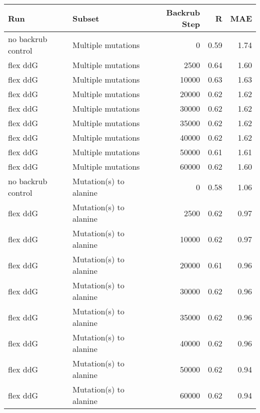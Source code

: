 \begin{table}
\begin{tabular}{llrrr}
\toprule
                Run &                               Subset &  Backrub Step &    R &  MAE \\
\midrule
 no backrub control &                   Multiple mutations &             0 & 0.59 & 1.74 \\
           flex ddG &                   Multiple mutations &          2500 & 0.64 & 1.60 \\
           flex ddG &                   Multiple mutations &         10000 & 0.63 & 1.63 \\
           flex ddG &                   Multiple mutations &         20000 & 0.62 & 1.62 \\
           flex ddG &                   Multiple mutations &         30000 & 0.62 & 1.62 \\
           flex ddG &                   Multiple mutations &         35000 & 0.62 & 1.62 \\
           flex ddG &                   Multiple mutations &         40000 & 0.62 & 1.62 \\
           flex ddG &                   Multiple mutations &         50000 & 0.61 & 1.61 \\
           flex ddG &                   Multiple mutations &         60000 & 0.62 & 1.60 \\
 no backrub control &               Mutation(s) to alanine &             0 & 0.58 & 1.06 \\
           flex ddG &               Mutation(s) to alanine &          2500 & 0.62 & 0.97 \\
           flex ddG &               Mutation(s) to alanine &         10000 & 0.62 & 0.97 \\
           flex ddG &               Mutation(s) to alanine &         20000 & 0.61 & 0.96 \\
           flex ddG &               Mutation(s) to alanine &         30000 & 0.62 & 0.96 \\
           flex ddG &               Mutation(s) to alanine &         35000 & 0.62 & 0.96 \\
           flex ddG &               Mutation(s) to alanine &         40000 & 0.62 & 0.96 \\
           flex ddG &               Mutation(s) to alanine &         50000 & 0.62 & 0.94 \\
           flex ddG &               Mutation(s) to alanine &         60000 & 0.62 & 0.94 \\

\end{tabular}
\end{table}
